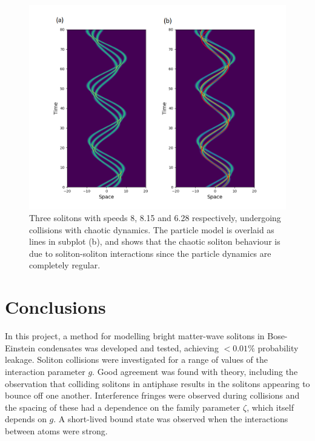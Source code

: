 \documentclass[10pt, twocolumn]{revtex4}    %
\begin{document}
\begin{figure}[h]
\includegraphics[width=\columnwidth]{chaotic.png}
\caption{Three solitons with speeds 8, 8.15 and 6.28 respectively, undergoing collisions with chaotic dynamics. The particle model is overlaid as lines in subplot (b), and shows that the chaotic soliton behaviour is due to soliton-soliton interactions since the particle dynamics are completely regular.}
\label{chaotic}
\end{figure}



\section{Conclusions}

In this project, a method for modelling bright matter-wave solitons in Bose-Einstein condensates was developed and tested, achieving $<0.01\%$ probability leakage. Soliton collisions were investigated for a range of values of the interaction parameter $g$. Good agreement was found with theory, including the observation that colliding solitons in antiphase results in the solitons appearing to bounce off one another. Interference fringes were observed during collisions and the spacing of these had a dependence on the family parameter $\zeta$, which itself depends on $g$. A short-lived bound state was observed when the interactions between atoms were strong. 
\end{document}
